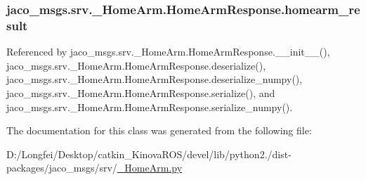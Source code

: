 \subsubsection[{\texorpdfstring{homearm\+\_\+result}{homearm_result}}]{\setlength{\rightskip}{0pt plus 5cm}jaco\+\_\+msgs.\+srv.\+\_\+\+Home\+Arm.\+Home\+Arm\+Response.\+homearm\+\_\+result}\hypertarget{classjaco__msgs_1_1srv_1_1__HomeArm_1_1HomeArmResponse_ab8f752cc7b9a50d887ea43e81ac6da6b}{}\label{classjaco__msgs_1_1srv_1_1__HomeArm_1_1HomeArmResponse_ab8f752cc7b9a50d887ea43e81ac6da6b}


Referenced by jaco\+\_\+msgs.\+srv.\+\_\+\+Home\+Arm.\+Home\+Arm\+Response.\+\_\+\+\_\+init\+\_\+\+\_\+(), jaco\+\_\+msgs.\+srv.\+\_\+\+Home\+Arm.\+Home\+Arm\+Response.\+deserialize(), jaco\+\_\+msgs.\+srv.\+\_\+\+Home\+Arm.\+Home\+Arm\+Response.\+deserialize\+\_\+numpy(), jaco\+\_\+msgs.\+srv.\+\_\+\+Home\+Arm.\+Home\+Arm\+Response.\+serialize(), and jaco\+\_\+msgs.\+srv.\+\_\+\+Home\+Arm.\+Home\+Arm\+Response.\+serialize\+\_\+numpy().



The documentation for this class was generated from the following file\+:\begin{DoxyCompactItemize}
\item 
D\+:/\+Longfei/\+Desktop/catkin\+\_\+\+Kinova\+R\+O\+S/devel/lib/python2./dist-\/packages/jaco\+\_\+msgs/srv/\hyperlink{__HomeArm_8py}{\+\_\+\+Home\+Arm.\+py}\end{DoxyCompactItemize}
